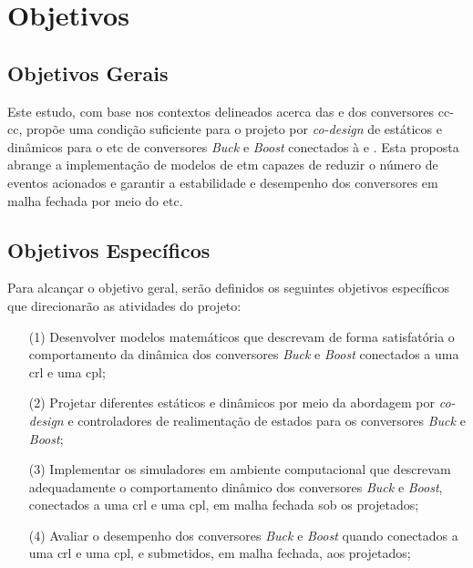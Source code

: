 \section{Objetivos}

\subsection{Objetivos Gerais}

Este estudo, com base nos contextos delineados acerca das  e dos conversores \acrshort{cc}-\acrshort{cc}, propõe uma condição suficiente para o projeto por \textit{co-design} de  estáticos e dinâmicos para o \acrshort{etc} de conversores \textit{Buck} e \textit{Boost} conectados à  e . Esta proposta abrange a implementação de modelos de \acrshort{etm} capazes de reduzir o número de eventos acionados e garantir a estabilidade e desempenho dos conversores em malha fechada por meio do \acrshort{etc}.

\subsection{Objetivos Específicos}
Para alcançar o objetivo geral, serão definidos os seguintes objetivos específicos que direcionarão as atividades do projeto:

\begin{enumerate}
  \item[(1)] Desenvolver modelos matemáticos que descrevam de forma satisfatória o comportamento da dinâmica dos conversores \textit{Buck} e \textit{Boost} conectados a uma \acrshort{crl} e uma \acrshort{cpl};
  \item[(2)] Projetar diferentes  estáticos e dinâmicos por meio da abordagem por \textit{co-design} e controladores de realimentação de estados para os conversores \textit{Buck} e \textit{Boost};
  \item[(3)] Implementar os simuladores em ambiente computacional que descrevam adequadamente o comportamento dinâmico dos conversores \textit{Buck} e \textit{Boost}, conectados a uma \acrshort{crl} e uma \acrshort{cpl}, em malha fechada sob os  projetados;
  \item[(4)] Avaliar o desempenho dos conversores \textit{Buck} e \textit{Boost} quando conectados a uma \acrshort{crl} e uma \acrshort{cpl}, e submetidos, em malha fechada, aos  projetados;
\end{enumerate}

